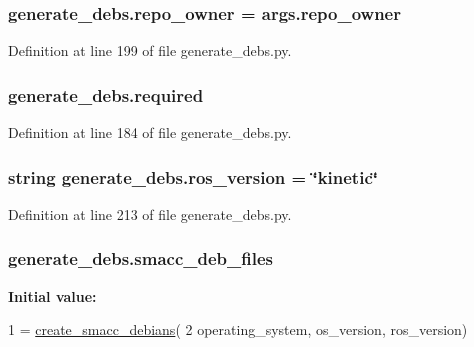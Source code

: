 \subsubsection[{\texorpdfstring{repo\+\_\+owner}{repo_owner}}]{\setlength{\rightskip}{0pt plus 5cm}generate\+\_\+debs.\+repo\+\_\+owner = args.\+repo\+\_\+owner}\hypertarget{namespacegenerate__debs_a23479dba5af50c90f3346b04d441ab2b}{}\label{namespacegenerate__debs_a23479dba5af50c90f3346b04d441ab2b}


Definition at line 199 of file generate\+\_\+debs.\+py.

\subsubsection[{\texorpdfstring{required}{required}}]{\setlength{\rightskip}{0pt plus 5cm}generate\+\_\+debs.\+required}\hypertarget{namespacegenerate__debs_a0199b8275e1bb7cf8a3355b264a5e305}{}\label{namespacegenerate__debs_a0199b8275e1bb7cf8a3355b264a5e305}


Definition at line 184 of file generate\+\_\+debs.\+py.

\subsubsection[{\texorpdfstring{ros\+\_\+version}{ros_version}}]{\setlength{\rightskip}{0pt plus 5cm}string generate\+\_\+debs.\+ros\+\_\+version = \char`\"{}kinetic\char`\"{}}\hypertarget{namespacegenerate__debs_ab436d8146ee3697ac269d8398023fb37}{}\label{namespacegenerate__debs_ab436d8146ee3697ac269d8398023fb37}


Definition at line 213 of file generate\+\_\+debs.\+py.

\subsubsection[{\texorpdfstring{smacc\+\_\+deb\+\_\+files}{smacc_deb_files}}]{\setlength{\rightskip}{0pt plus 5cm}generate\+\_\+debs.\+smacc\+\_\+deb\+\_\+files}\hypertarget{namespacegenerate__debs_ab78bceb1d7beaba0f39c13322ca316d7}{}\label{namespacegenerate__debs_ab78bceb1d7beaba0f39c13322ca316d7}
{\bfseries Initial value\+:}
\begin{DoxyCode}
1 = \hyperlink{namespacegenerate__debs_ad2e4e864bf753dbb1ed9a58436739905}{create\_smacc\_debians}(
2         operating\_system, os\_version, ros\_version)
\end{DoxyCode}



